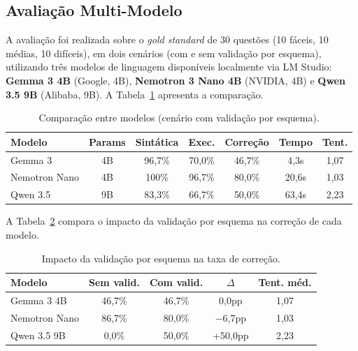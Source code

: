 \documentclass[12pt]{article}
\begin{document}
\subsection{Avalia\c{c}\~{a}o Multi-Modelo}
\label{sec:resultados_quant}

A avalia\c{c}\~{a}o foi realizada sobre o \textit{gold standard} de 30 quest\~{o}es (10 f\'{a}ceis, 10 m\'{e}dias, 10 dif\'{i}ceis), em dois cen\'{a}rios (com e sem valida\c{c}\~{a}o por esquema), utilizando tr\^{e}s modelos de linguagem dispon\'{i}veis localmente via LM Studio: \textbf{Gemma 3 4B} (Google, 4B), \textbf{Nemotron 3 Nano 4B} (NVIDIA, 4B) e \textbf{Qwen 3.5 9B} (Alibaba, 9B). A Tabela~\ref{tab:multimodelo} apresenta a compara\c{c}\~{a}o.

\begin{table}[H]
\centering
\caption{Compara\c{c}\~{a}o entre modelos (cen\'{a}rio com valida\c{c}\~{a}o por esquema).}
\label{tab:multimodelo}
\small
\begin{tabular}{lcccccc}
\toprule
\textbf{Modelo} & \textbf{Params} & \textbf{Sint\'{a}tica} & \textbf{Exec.} & \textbf{Corre\c{c}\~{a}o} & \textbf{Tempo} & \textbf{Tent.} \\
\midrule
Gemma 3        & 4B & 96,7\% & 70,0\% & 46,7\% & 4,3s  & 1,07 \\
Nemotron Nano  & 4B & 100\%  & 96,7\% & 80,0\% & 20,6s & 1,03 \\
Qwen 3.5       & 9B & 83,3\% & 66,7\% & 50,0\% & 63,4s & 2,23 \\
\bottomrule
\end{tabular}
\end{table}

A Tabela~\ref{tab:comvsem} compara o impacto da valida\c{c}\~{a}o por esquema na corre\c{c}\~{a}o de cada modelo.

\begin{table}[H]
\centering
\caption{Impacto da valida\c{c}\~{a}o por esquema na taxa de corre\c{c}\~{a}o.}
\label{tab:comvsem}
\small
\begin{tabular}{lcccc}
\toprule
\textbf{Modelo} & \textbf{Sem valid.} & \textbf{Com valid.} & \textbf{$\Delta$} & \textbf{Tent. m\'{e}d.} \\
\midrule
Gemma 3 4B    & 46,7\% & 46,7\% & 0,0pp  & 1,07 \\
Nemotron Nano & 86,7\% & 80,0\% & $-$6,7pp & 1,03 \\
Qwen 3.5 9B  & 0,0\%  & 50,0\% & +50,0pp & 2,23 \\
\bottomrule
\end{tabular}
\end{table}
\end{document}

